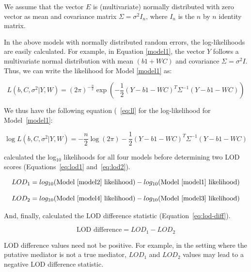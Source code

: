 \documentclass[oneside]{book}\usepackage[]{graphicx}\usepackage[]{color}
\begin{document}
We assume that the vector $E$ is (multivariate) normally distributed with zero vector as mean and covariance matrix $\Sigma = \sigma^2I_n$, where $I_n$ is the $n$ by $n$ identity matrix.

In the above models with normally distributed random errors, the log-likelihoods are easily calculated. For example, in Equation \ref{model1}, the vector $Y$ follows a multivariate normal distribution with mean $(b1 + WC)$ and covariance $\Sigma = \sigma^2I$. Thus, we can write the likelihood for Model \ref{model1} as:

\begin{equation}
    L(b, C, \sigma^2| Y, W) = (2\pi)^{- \frac{n}{2}}\exp{ \left(- \frac{1}{2}(Y - b1 - WC)^T\Sigma^{-1}(Y - b1 - WC)\right)}
\end{equation}

We thus have the following equation (~\ref{eq:ll} for the log-likelihood for Model~\ref{model1}:

\begin{equation}
    \log L(b, C, \sigma^2 | Y, W) = - \frac{n}{2}\log (2\pi) - \frac{1}{2} (Y - b1 - WC)^T\Sigma^{-1}(Y - b1 - WC)\label{eq:ll}
\end{equation}


\citet{chick2016defining} calculated the log$_{10}$ likelihoods for all four models before determining two LOD scores (Equations~\ref{eq:lod1} and~\ref{eq:lod2}).


\begin{equation}
LOD_1 = log_{10}(\text{Model~\ref{model2} likelihood}) - log_{10}(\text{Model~\ref{model1} likelihood})\label{eq:lod1}
\end{equation}

\begin{equation}
LOD_2 = log_{10}(\text{Model~\ref{model4} likelihood}) - log_{10}(\text{Model~\ref{model3} likelihood})\label{eq:lod2}
\end{equation}

And, finally, \citet{chick2016defining} calculated the LOD difference statistic (Equation~\ref{eq:lod-diff}).

\begin{equation}
\text{LOD difference} = LOD_1 - LOD_2\label{eq:lod-diff}
\end{equation}

LOD difference values need not be positive. 
For example, in the setting where the putative mediator is not a true mediator, $LOD_1$ and $LOD_2$ values may lead to a negative LOD difference statistic. 
\end{document}
